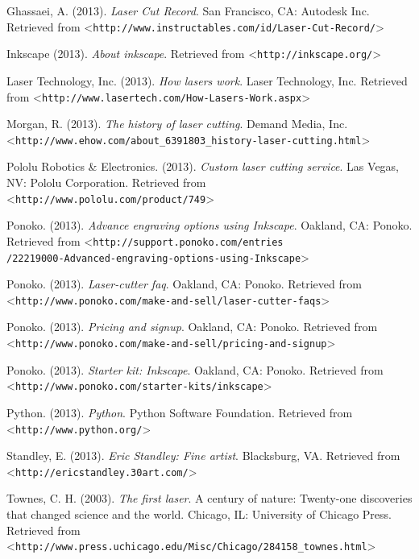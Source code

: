 \documentclass[12pt singlecol]{article}
\begin{document}
\begin{flushleft}
\begin{thebibliography}{99\kern\bibindent}
	 Ghassaei, A. (2013). \emph{Laser Cut Record}. San Francisco, CA: Autodesk Inc. Retrieved from \textless\texttt{http://www.instructables.com/id/Laser-Cut-Record/}\textgreater

	 Inkscape (2013). \emph{About inkscape}. Retrieved from \textless\texttt{http://inkscape.org/}\textgreater

	 Laser Technology, Inc. (2013). \emph{How lasers work}. Laser Technology, Inc. Retrieved from \textless\texttt{http://www.lasertech.com/How-Lasers-Work.aspx}\textgreater

	 Morgan, R. (2013). \emph{The history of laser cutting}. Demand Media, Inc. \textless\texttt{http://www.ehow.com/about\_6391803\_history-laser-cutting.html}\textgreater

	 Pololu Robotics \& Electronics. (2013). \emph{Custom laser cutting service}. Las Vegas, NV: Pololu Corporation. Retrieved from \textless\texttt{http://www.pololu.com/product/749}\textgreater

	 Ponoko. (2013). \emph{Advance engraving options using Inkscape}. Oakland, CA: Ponoko. Retrieved from \textless\texttt{http://support.ponoko.com/entries\\/22219000-Advanced-engraving-options-using-Inkscape}\textgreater

	 Ponoko. (2013). \emph{Laser-cutter faq}. Oakland, CA: Ponoko. Retrieved from \textless\texttt{http://www.ponoko.com/make-and-sell/laser-cutter-faqs}\textgreater

	 Ponoko. (2013). \emph{Pricing and signup}. Oakland, CA: Ponoko. Retrieved from \textless\texttt{http://www.ponoko.com/make-and-sell/pricing-and-signup}\textgreater

	 Ponoko. (2013). \emph{Starter kit: Inkscape}. Oakland, CA: Ponoko. Retrieved from \textless\texttt{http://www.ponoko.com/starter-kits/inkscape}\textgreater

	 Python. (2013). \emph{Python}. Python Software Foundation. Retrieved from \textless\texttt{http://www.python.org/}\textgreater

	 Standley, E. (2013). \emph{Eric Standley: Fine artist}. Blacksburg, VA. Retrieved from \textless\texttt{http://ericstandley.30art.com/}\textgreater

	 Townes, C. H. (2003). \emph{The first laser}. A century of nature: Twenty-one discoveries that changed science and the world. Chicago, IL: University of Chicago Press. Retrieved from \textless\texttt{http://www.press.uchicago.edu/Misc/Chicago/284158\_townes.html}\textgreater


\end{thebibliography}
\end{flushleft}
\end{document}
